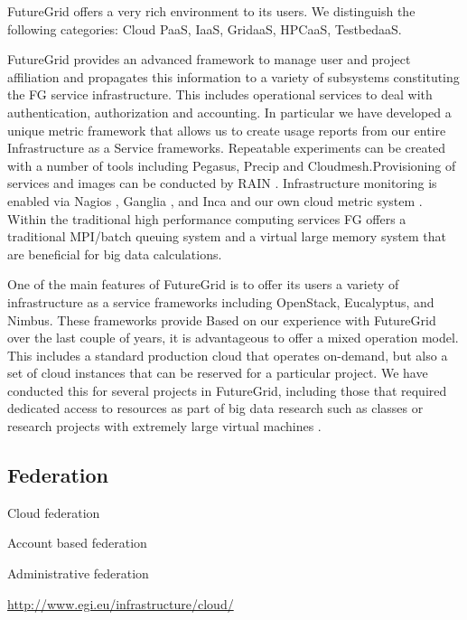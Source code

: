 \documentclass{tex/sig-alternate-2013}
\begin{document}
FutureGrid offers a very rich environment to its users. We distinguish the following categories: Cloud PaaS, IaaS, GridaaS, HPCaaS, TestbedaaS.

FutureGrid provides an advanced framework to manage user and project affiliation and propagates this information to a variety of subsystems constituting the FG service infrastructure. This includes operational services to deal with authentication, authorization and accounting. In particular we have developed a unique metric framework that allows us to create usage reports from our entire Infrastructure as a Service frameworks. Repeatable experiments can be created with a number of tools including Pegasus, Precip and Cloudmesh.Provisioning of services and images can be conducted by RAIN \cite{imagemanagement,fg-1295}. Infrastructure monitoring is enabled via Nagios \cite{nagios}, Ganglia \cite{ganglia}, and Inca \cite{inca} and our own cloud metric system \cite{las08federated-cloud}.
Within the traditional high performance computing services FG offers a traditional MPI/batch queuing system and a virtual large memory system that are beneficial for big data calculations.


One of the main features of FutureGrid is to offer its users a variety
of infrastructure as a service frameworks
\cite{comparisoncloud,las2011virt} including OpenStack, Eucalyptus,
and Nimbus. These frameworks provide Based on our experience with
FutureGrid over the last couple of years, it is advantageous to offer
a mixed operation model. This includes a standard production cloud
that operates on-demand, but also a set of cloud instances that can be
reserved for a particular project. We have conducted this for several
projects in FutureGrid, including those that required dedicated access
to resources as part of big data research such as classes
\cite{fg405,fg368} or research projects with extremely large virtual
machines \cite{fg298}.

\subsection{Federation}

Cloud federation

Account based federation

Administrative federation

\url{http://www.egi.eu/infrastructure/cloud/}


\cite{kurze2011cloudfederation}
\end{document}
